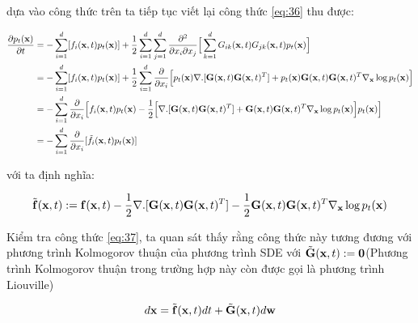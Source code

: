 \documentclass{article} %
\begin{document}
dựa vào công thức trên ta tiếp tục viết lại công thức \ref{eq:36} thu được:

\begin{equation} \label{eq:37}
    \begin{aligned}
        \dfrac{\partial p_t (\bold{x})}{\partial t} &= - \sum_{i=1}^d \lbrack f_i (\bold{x}, t) p_t(\bold{x}) \rbrack + \dfrac{1}{2} \sum_{i=1}^d \sum_{j=1}^d \dfrac{\partial^2}{\partial x_i \partial x_j} \Big \lbrack \sum_{k=1}^d G_{ik} (\bold{x}, t) G_{jk}(\bold{x}, t) p_t (\bold{x}) \Big \rbrack \\
        &= - \sum_{i=1}^d \lbrack f_i (\bold{x}, t) p_t(\bold{x}) \rbrack + \dfrac{1}{2} \sum_{i=1}^d \dfrac{\partial}{\partial x_i} \Big \lbrack p_t(\bold{x}) \nabla . \lbrack \bold{G}(\bold{x}, t) \bold{G}(\bold{x}, t)^T \rbrack + p_t(\bold{x}) \bold{G}(\bold{x}, t) \bold{G}(\bold{x}, t)^T \nabla_{\bold{x}} \log p_t (\bold{x}) \Big \rbrack \\
        &= -\sum_{i=1}^d \dfrac{\partial}{\partial x_i} \Big \lbrack f_i(\bold{x}, t) p_t(\bold{x}) - \dfrac{1}{2} \Big \lbrack \nabla . \lbrack \bold{G}(\bold{x}, t) \bold{G}(\bold{x}, t)^T \rbrack + \bold{G}(\bold{x}, t) \bold{G}(\bold{x}, t)^T \nabla_{\bold{x}} \log p_t(\bold{x})  \Big \rbrack p_t(\bold{x}) \Big \rbrack \\
        &= - \sum_{i=1}^d \dfrac{\partial}{\partial x_i} \lbrack \tilde{f}_i (\bold{x}, t) p_t(\bold{x}) \rbrack
    \end{aligned}
\end{equation}

với ta định nghĩa:

\begin{equation*}
    \tilde{\bold{f}}(\bold{x}, t) := \bold{f}(\bold{x}, t) - \dfrac{1}{2} \nabla . \lbrack \bold{G}(\bold{x}, t) \bold{G}(\bold{x}, t)^T \rbrack - \dfrac{1}{2} \bold{G}(\bold{x}, t) \bold{G}(\bold{x}, t)^T \nabla_{\bold{x}} \log p_t(\bold{x})
\end{equation*}

Kiểm tra công thức \ref{eq:37}, ta quan sát thấy rằng công thức này tương đương với phương trình Kolmogorov thuận của phương trình SDE với $\tilde{\bold{G}} (\bold{x}, t) := \bold{0}$(Phương trình Kolmogorov thuận trong trường hợp này còn được gọi là phương trình Liouville)

\begin{equation*}
    d \bold{x} = \tilde{\bold{f}} (\bold{x}, t) dt + \tilde{\bold{G}}(\bold{x}, t) d \bold{w}
\end{equation*}
\end{document}
